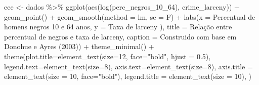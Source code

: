 \documentclass[
]{article}
\newenvironment{Shaded}{\begin{snugshade}}{\end{snugshade}}
\newcommand{\AttributeTok}[1]{\textcolor[rgb]{0.77,0.63,0.00}{#1}}
\newcommand{\DecValTok}[1]{\textcolor[rgb]{0.00,0.00,0.81}{#1}}
\newcommand{\FloatTok}[1]{\textcolor[rgb]{0.00,0.00,0.81}{#1}}
\newcommand{\FunctionTok}[1]{\textcolor[rgb]{0.00,0.00,0.00}{#1}}
\newcommand{\NormalTok}[1]{#1}
\newcommand{\OtherTok}[1]{\textcolor[rgb]{0.56,0.35,0.01}{#1}}
\newcommand{\SpecialCharTok}[1]{\textcolor[rgb]{0.00,0.00,0.00}{#1}}
\newcommand{\StringTok}[1]{\textcolor[rgb]{0.31,0.60,0.02}{#1}}
\begin{document}
\begin{Shaded}
\begin{Highlighting}[]
\NormalTok{eee }\OtherTok{\textless{}{-}}\NormalTok{ dados }\SpecialCharTok{\%\textgreater{}\%} 
  \FunctionTok{ggplot}\NormalTok{(}\FunctionTok{aes}\NormalTok{(}\FunctionTok{log}\NormalTok{(perc\_negros\_10\_64), crime\_larceny)) }\SpecialCharTok{+}
  \FunctionTok{geom\_point}\NormalTok{() }\SpecialCharTok{+} 
  \FunctionTok{geom\_smooth}\NormalTok{(}\AttributeTok{method =} \StringTok{\textquotesingle{}lm\textquotesingle{}}\NormalTok{, }\AttributeTok{se =}\NormalTok{ F) }\SpecialCharTok{+}
  \FunctionTok{labs}\NormalTok{(}\AttributeTok{x =} \StringTok{\textquotesingle{}Percentual de homens negros 10 e 64 anos\textquotesingle{}}\NormalTok{,}
       \AttributeTok{y =} \StringTok{\textquotesingle{}Taxa de larceny )\textquotesingle{}}\NormalTok{,}
       \AttributeTok{title =} \StringTok{\textquotesingle{}Relação entre percentual de negros e taxa de larceny\textquotesingle{}}\NormalTok{,}
       \AttributeTok{caption =} \StringTok{\textquotesingle{}Construido com base em Donohue e Ayres (2003)\textquotesingle{}}\NormalTok{) }\SpecialCharTok{+} 
  \FunctionTok{theme\_minimal}\NormalTok{() }\SpecialCharTok{+}
  \FunctionTok{theme}\NormalTok{(}\AttributeTok{plot.title=}\FunctionTok{element\_text}\NormalTok{(}\AttributeTok{size=}\DecValTok{12}\NormalTok{, }\AttributeTok{face=}\StringTok{"bold"}\NormalTok{, }\AttributeTok{hjust =} \FloatTok{0.5}\NormalTok{),}
        \AttributeTok{legend.text=}\FunctionTok{element\_text}\NormalTok{(}\AttributeTok{size=}\DecValTok{8}\NormalTok{),}
        \AttributeTok{axis.text=}\FunctionTok{element\_text}\NormalTok{(}\AttributeTok{size=}\DecValTok{8}\NormalTok{),}
        \AttributeTok{axis.title =} \FunctionTok{element\_text}\NormalTok{(}\AttributeTok{size =} \DecValTok{10}\NormalTok{, }\AttributeTok{face=}\StringTok{"bold"}\NormalTok{),}
        \AttributeTok{legend.title =} \FunctionTok{element\_text}\NormalTok{(}\AttributeTok{size =} \DecValTok{10}\NormalTok{),}
\NormalTok{  )}


\end{Highlighting}
\end{Shaded}
\end{document}
